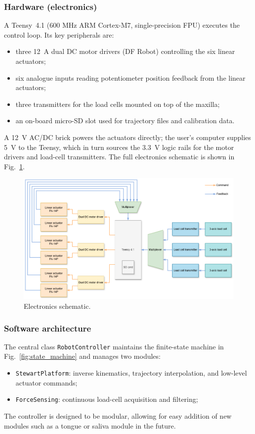 \subsubsection{Hardware (electronics)}
A Teensy~4.1 (600 MHz ARM Cortex-M7, single-precision FPU) executes the control loop.%
Its key peripherals are:  
\begin{itemize}[nosep]
    \item three \SI{12}{\ampere} dual DC motor drivers (DF Robot) controlling the six linear actuators;
    \item six analogue inputs reading potentiometer position feedback from the linear actuators;
    \item three transmitters for the load cells mounted on top of the maxilla;
    \item an on-board micro-SD slot used for trajectory files and calibration data.
\end{itemize}
A \SI{12}{\volt} AC/DC brick powers the actuators directly; the user's computer supplies \SI{5}{\volt} to the Teensy, which in 
turn sources the \SI{3.3}{\volt} logic rails for the motor drivers and load-cell transmitters.
The full electronics schematic is shown in Fig.~\ref{fig:elec_schematic}.

\begin{figure}[H]
\centering
\includegraphics[width=\textwidth]{figures/elec_schematic.drawio.png}
\caption{Electronics schematic.}
\label{fig:elec_schematic}
\end{figure}

\subsubsection{Software architecture}
The central class \texttt{RobotController} maintains the finite-state machine in Fig.~\ref{fig:state_machine} and manages two
 modules:  
\begin{itemize}[nosep]
    \item \texttt{StewartPlatform}: inverse kinematics, trajectory interpolation, and low-level actuator commands;
    \item \texttt{ForceSensing}: continuous load-cell acquisition and filtering;
\end{itemize}
The controller is designed to be modular, allowing for easy addition of new modules such as a tongue or saliva module in the future.

